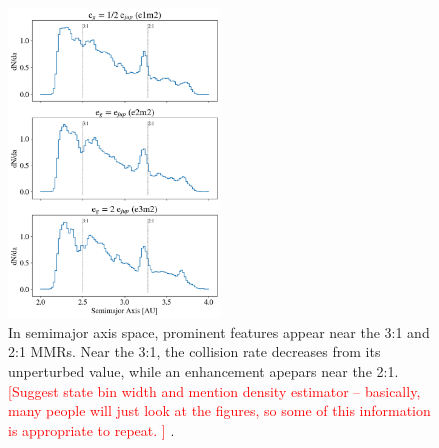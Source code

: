 \documentclass[twocolumn]{aastex63}
\newcommand{\ACBc}[1]{\textcolor{red}{#1}}
\begin{document}
\begin{figure}
\begin{center}
    \includegraphics[width=0.5\textwidth]{figures/coll_hist_a.png}
    \caption{In semimajor axis space, prominent features appear near the 3:1 and 2:1 MMRs. Near the 3:1, the collision
    rate decreases from its unperturbed value, while an enhancement apepars near the 2:1. \ACBc{[Suggest state bin width and mention density estimator -- basically, many people will just look at the figures, so some of this information is appropriate to repeat. ]} .\label{fig:coll_hist_a}} 
\end{center}
\end{figure}
\end{document}
